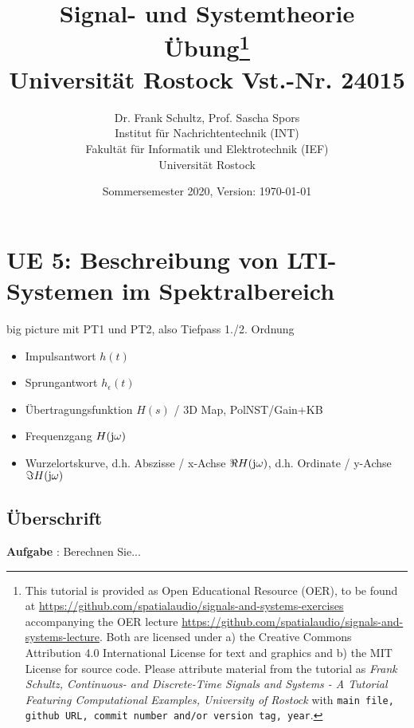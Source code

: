 \documentclass[11pt,a4paper,DIV=12]{scrartcl}
\title{Signal- und Systemtheorie\\
Übung\thanks{
This tutorial is provided as Open Educational Resource (OER), to be found at
\url{https://github.com/spatialaudio/signals-and-systems-exercises}
accompanying the OER lecture
\url{https://github.com/spatialaudio/signals-and-systems-lecture}.
%
Both are licensed under a) the Creative Commons Attribution 4.0 International
License for text and graphics and b) the MIT License for source code.
%
Please attribute material from the tutorial as \textit{Frank Schultz,
Continuous- and Discrete-Time Signals and Systems - A Tutorial Featuring
Computational Examples, University of Rostock} with
\texttt{main file, github URL, commit number and/or version tag, year}.
}
\\
\small Universität Rostock Vst.-Nr. 24015}
\author{Dr. Frank Schultz, Prof. Sascha Spors\\
\small Institut für Nachrichtentechnik (INT)\\
\small Fakultät für Informatik und Elektrotechnik (IEF)\\
\small Universität Rostock
}
\date{Sommersemester 2020, Version: \today}
\numberwithin{equation}{section}
\numberwithin{figure}{section}
\begin{document}
\maketitle
\tableofcontents

%





\setcounter{section}{4}








\clearpage
\section{UE 5: Beschreibung von LTI-Systemen im Spektralbereich}

big picture mit PT1 und PT2, also Tiefpass 1./2. Ordnung
\begin{itemize}
  \item Impulsantwort $h(t)$
  \item Sprungantwort $h_\epsilon(t)$
  \item Übertragungsfunktion $H(s)$ / 3D Map, PolNST/Gain+KB
  \item Frequenzgang $H(\im\omega)$
  \item Wurzelortskurve, d.h. Abszisse / x-Achse  $\Re H(\im\omega)$, d.h. Ordinate / y-Achse  $\Im H(\im\omega)$
\end{itemize}


\newpage
\subsection{Überschrift}
\label{sec:}
\begin{Ziel}
\end{Ziel}
\textbf{Aufgabe} {\tiny }: Berechnen Sie...
\begin{Werkzeug}
\end{Werkzeug}
\begin{Ansatz}
\end{Ansatz}
\begin{ExCalc}
\end{ExCalc}
\begin{Loesung}
\end{Loesung}
\end{document}
